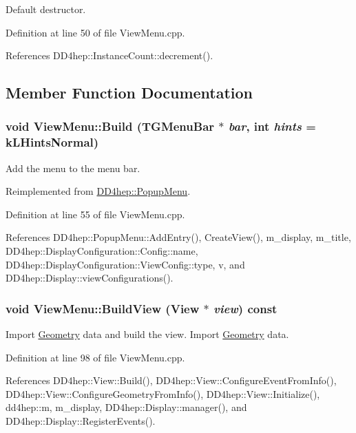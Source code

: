 Default destructor. 

Definition at line 50 of file ViewMenu.cpp.

References DD4hep::InstanceCount::decrement().

\subsection{Member Function Documentation}
\hypertarget{class_d_d4hep_1_1_view_menu_abd9d63ee3f3ca7b16a646b29e41a855c}{
\subsubsection[{Build}]{\setlength{\rightskip}{0pt plus 5cm}void ViewMenu::Build (TGMenuBar $\ast$ {\em bar}, \/  int {\em hints} = {\ttfamily kLHintsNormal})}}
\label{class_d_d4hep_1_1_view_menu_abd9d63ee3f3ca7b16a646b29e41a855c}


Add the menu to the menu bar. 

Reimplemented from \hyperlink{class_d_d4hep_1_1_popup_menu_a896a1626d79fd3d6ccb1c1e0657cf1ae}{DD4hep::PopupMenu}.

Definition at line 55 of file ViewMenu.cpp.

References DD4hep::PopupMenu::AddEntry(), CreateView(), m\_\-display, m\_\-title, DD4hep::DisplayConfiguration::Config::name, DD4hep::DisplayConfiguration::ViewConfig::type, v, and DD4hep::Display::viewConfigurations().\hypertarget{class_d_d4hep_1_1_view_menu_a0f001eb726cf3afc4f48067b5c233569}{
\subsubsection[{BuildView}]{\setlength{\rightskip}{0pt plus 5cm}void ViewMenu::BuildView ({\bf View} $\ast$ {\em view}) const}}
\label{class_d_d4hep_1_1_view_menu_a0f001eb726cf3afc4f48067b5c233569}


Import \hyperlink{namespace_d_d4hep_1_1_geometry}{Geometry} data and build the view. Import \hyperlink{namespace_d_d4hep_1_1_geometry}{Geometry} data. 

Definition at line 98 of file ViewMenu.cpp.

References DD4hep::View::Build(), DD4hep::View::ConfigureEventFromInfo(), DD4hep::View::ConfigureGeometryFromInfo(), DD4hep::View::Initialize(), dd4hep::m, m\_\-display, DD4hep::Display::manager(), and DD4hep::Display::RegisterEvents().

